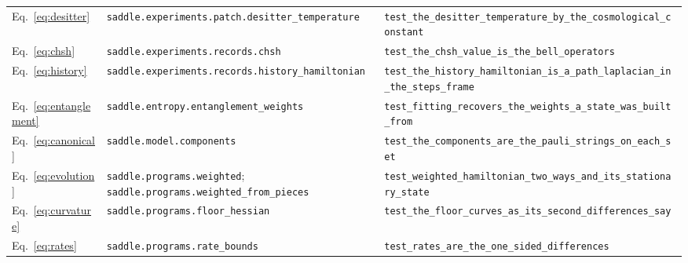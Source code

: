 \begin{tabular}{lp{2.55in}p{3.15in}}
Eq.~\eqref{eq:desitter} & \raggedright \texttt{saddle.\allowbreak{}experiments.\allowbreak{}patch.\allowbreak{}desitter\_\allowbreak{}temperature} & \raggedright \texttt{test\_\allowbreak{}the\_\allowbreak{}desitter\_\allowbreak{}temperature\_\allowbreak{}by\_\allowbreak{}the\_\allowbreak{}cosmological\_\allowbreak{}constant} \tabularnewline
Eq.~\eqref{eq:chsh} & \raggedright \texttt{saddle.\allowbreak{}experiments.\allowbreak{}records.\allowbreak{}chsh} & \raggedright \texttt{test\_\allowbreak{}the\_\allowbreak{}chsh\_\allowbreak{}value\_\allowbreak{}is\_\allowbreak{}the\_\allowbreak{}bell\_\allowbreak{}operators} \tabularnewline
Eq.~\eqref{eq:history} & \raggedright \texttt{saddle.\allowbreak{}experiments.\allowbreak{}records.\allowbreak{}history\_\allowbreak{}hamiltonian} & \raggedright \texttt{test\_\allowbreak{}the\_\allowbreak{}history\_\allowbreak{}hamiltonian\_\allowbreak{}is\_\allowbreak{}a\_\allowbreak{}path\_\allowbreak{}laplacian\_\allowbreak{}in\_\allowbreak{}the\_\allowbreak{}steps\_\allowbreak{}frame} \tabularnewline
Eq.~\eqref{eq:entanglement} & \raggedright \texttt{saddle.\allowbreak{}entropy.\allowbreak{}entanglement\_\allowbreak{}weights} & \raggedright \texttt{test\_\allowbreak{}fitting\_\allowbreak{}recovers\_\allowbreak{}the\_\allowbreak{}weights\_\allowbreak{}a\_\allowbreak{}state\_\allowbreak{}was\_\allowbreak{}built\_\allowbreak{}from} \tabularnewline
Eq.~\eqref{eq:canonical} & \raggedright \texttt{saddle.\allowbreak{}model.\allowbreak{}components} & \raggedright \texttt{test\_\allowbreak{}the\_\allowbreak{}components\_\allowbreak{}are\_\allowbreak{}the\_\allowbreak{}pauli\_\allowbreak{}strings\_\allowbreak{}on\_\allowbreak{}each\_\allowbreak{}set} \tabularnewline
Eq.~\eqref{eq:evolution} & \raggedright \texttt{saddle.\allowbreak{}programs.\allowbreak{}weighted}; \texttt{saddle.\allowbreak{}programs.\allowbreak{}weighted\_\allowbreak{}from\_\allowbreak{}pieces} & \raggedright \texttt{test\_\allowbreak{}weighted\_\allowbreak{}hamiltonian\_\allowbreak{}two\_\allowbreak{}ways\_\allowbreak{}and\_\allowbreak{}its\_\allowbreak{}stationary\_\allowbreak{}state} \tabularnewline
Eq.~\eqref{eq:curvature} & \raggedright \texttt{saddle.\allowbreak{}programs.\allowbreak{}floor\_\allowbreak{}hessian} & \raggedright \texttt{test\_\allowbreak{}the\_\allowbreak{}floor\_\allowbreak{}curves\_\allowbreak{}as\_\allowbreak{}its\_\allowbreak{}second\_\allowbreak{}differences\_\allowbreak{}say} \tabularnewline
Eq.~\eqref{eq:rates} & \raggedright \texttt{saddle.\allowbreak{}programs.\allowbreak{}rate\_\allowbreak{}bounds} & \raggedright \texttt{test\_\allowbreak{}rates\_\allowbreak{}are\_\allowbreak{}the\_\allowbreak{}one\_\allowbreak{}sided\_\allowbreak{}differences} \tabularnewline

\end{tabular}
